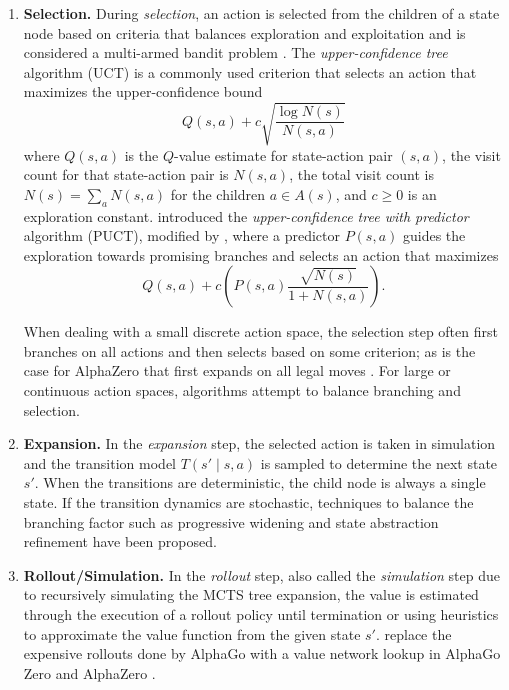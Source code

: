 \begin{enumerate}
    \item \textbf{Selection.}\quad 
    During \textit{selection}, an action is selected from the children of a state node based on criteria that balances exploration and exploitation and is considered a multi-armed bandit problem \cite{munos2014bandits}.
    The \textit{upper-confidence tree} algorithm (UCT) \cite{kocsis2006bandit} is a commonly used criterion that selects an action that maximizes the upper-confidence bound
    \begin{equation}
        Q(s, a) + c\sqrt{\frac{\log N(s)}{N(s,a)}} \label{eq:uct}
    \end{equation}
    where $Q(s,a)$ is the $Q$-value estimate for state-action pair $(s,a)$, the visit count for that state-action pair is $N(s,a)$, the total visit count is $N(s) = \sum_a N(s,a)$ for the children $a \in A(s)$, and $c \ge 0$ is an exploration constant.
    \citeauthor{rosin2011multi} introduced the \textit{upper-confidence tree with predictor} algorithm (PUCT), modified by \citeauthor{silver2017mastering}, where a predictor $P(s,a)$ guides the exploration towards promising branches and selects an action that maximizes
    \begin{equation}
        Q(s,a) + c\left(P(s,a)\frac{\sqrt{N(s)}}{1 + N(s,a)}\right). \label{eq:puct}
    \end{equation}

    When dealing with a small discrete action space, the selection step often first branches on all actions and then selects based on some criterion; as is the case for AlphaZero that first expands on all legal moves \cite{silver2016mastering, silver2018general}.
    For large or continuous action spaces, algorithms attempt to balance branching and selection.
   
    
    \item \textbf{Expansion.}\quad 
    In the \textit{expansion} step, the selected action is taken in simulation and the transition model $T(s' \mid s, a)$ is sampled to determine the next state $s'$.
    When the transitions are deterministic, the child node is always a single state.
    If the transition dynamics are stochastic, techniques to balance the branching factor such as progressive widening \cite{couetoux2011continuous} and state abstraction refinement \cite{sokota2021monte} have been proposed.
    
    
    \item \textbf{Rollout/Simulation.}\quad 
    In the \textit{rollout} step, also called the \textit{simulation} step due to recursively simulating the MCTS tree expansion, the value is estimated through the execution of a rollout policy until termination or using heuristics to approximate the value function from the given state $s'$.
    \citeauthor{silver2017mastering} replace the expensive rollouts done by AlphaGo with a value network lookup in AlphaGo Zero and AlphaZero \cite{silver2016mastering, silver2017mastering, silver2018general}.
    

\end{enumerate}
